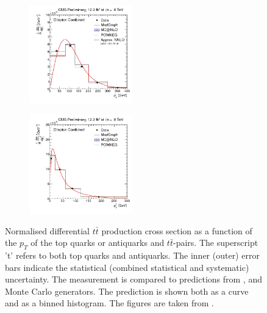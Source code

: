 \begin{figure}[h]
\centering
\begin{subfigure}
  \centering
  \includegraphics[width=0.49\textwidth]{05_kinReco/plots/DiffXS_HypToppT.png}
\end{subfigure}
\begin{subfigure}
  \centering
  \includegraphics[width=0.49\textwidth]{05_kinReco/plots/DiffXS_HypTTBarpT.png}
\end{subfigure}
\caption{Normalised differential $t\bar{t}$ production cross section as a function of the $p_{T}$ of the top quarks or antiquarks and $t\bar{t}$-pairs. 
         The superscript 't' refers to both top quarks and antiquarks. The inner (outer) error bars indicate the statistical (combined statistical and 
         systematic) uncertainty. The measurement is compared to predictions from \MG, \Powheg and \MCNLO Monte Carlo generators. The \MG prediction is 
         shown both as a curve and as a binned histogram. The figures are taken from \cite{TWikiTOP12028} \cite{Khachatryan:2015oqa}.}
\label{fig:xsec_top12028}
\end{figure}
